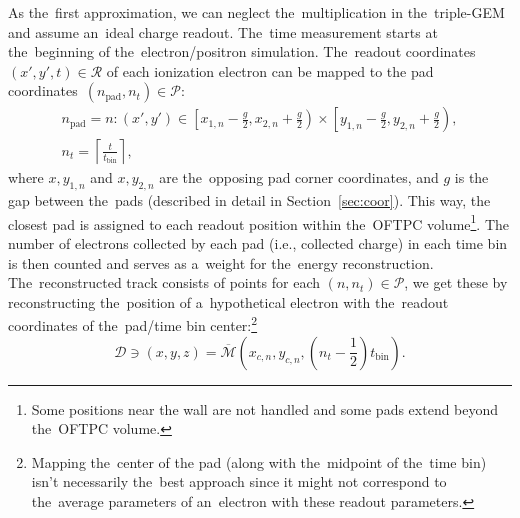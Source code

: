 		As the~first approximation, we can neglect the~multiplication in the~triple\nobreakdash-\ac{GEM} and assume an~ideal charge readout. The~time measurement starts at the~beginning of the~electron/positron simulation. The~readout coordinates ${(x',y',t)\in\mathcal{R}}$ of each ionization electron can be mapped to the pad coordinates~$(n_\text{pad},n_t) \in \mathcal{P}$:
			\begin{gather}
				n_\text{pad} = n\colon (x',y') \in \left[x_{1,n}-\frac{g}{2},x_{2,n}+\frac{g}{2}\right)\times\left[y_{1,n}-\frac{g}{2},y_{2,n}+\frac{g}{2}\right),\\
				n_t = \left\lceil \frac{t}{t_\text{bin}}\right\rceil,
			\end{gather}
		where $x,y_{1,n}$ and $x,y_{2,n}$ are the~opposing pad corner coordinates, and $g$ is the gap between the~pads (described in detail in Section~\ref{sec:coor}). This way, the closest pad is assigned to each readout position within the~\ac{OFTPC} volume\footnote{Some positions near the wall are not handled and some pads extend beyond the~\ac{OFTPC} volume.}. The number of electrons collected by each pad (i.e., collected charge) in each time bin is then counted and serves as a~weight for the~energy reconstruction. The~reconstructed track consists of points for each $(n,n_t)\in\mathcal{P}$, we get these by reconstructing the~position of a~hypothetical electron with the~readout coordinates of the~pad/time bin center:\footnote{Mapping the~center of the pad (along with the~midpoint of the~time bin) isn't necessarily the~best approach since it might not correspond to the~average parameters of an~electron with these readout parameters.}
			\begin{equation}
				\mathcal{D} \ni (x,y,z) = \overbar{\mathcal{M}}\left(x_{c,n},y_{c,n},\left(n_t-\frac{1}{2}\right)t_\text{bin}\right).
			\end{equation}